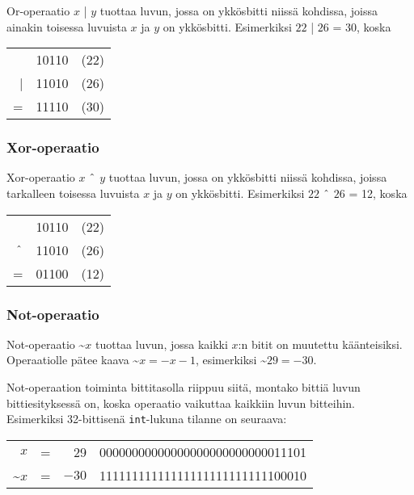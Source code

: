 
Or-operaatio $x$ | $y$ tuottaa luvun,
jossa on ykkösbitti niissä kohdissa,
joissa ainakin toisessa luvuista $x$ ja $y$ on ykkösbitti.
Esimerkiksi $22$ | $26$ = 30, koska

\begin{center}
\begin{tabular}{rrr}
& 10110 & (22)\\
| & 11010 & (26) \\
\hline
 = & 11110 & (30) \\
\end{tabular}
\end{center}

\subsubsection{Xor-operaatio}


Xor-operaatio $x$ $\XOR$ $y$ tuottaa luvun,
jossa on ykkösbitti niissä kohdissa,
joissa tarkalleen toisessa luvuista $x$ ja $y$ on ykkösbitti.
Esimerkiksi $22$ $\XOR$ $26$ = 12, koska

\begin{center}
\begin{tabular}{rrr}
& 10110 & (22)\\
$\XOR$ & 11010 & (26) \\
\hline
 = & 01100 & (12) \\
\end{tabular}
\end{center}

\subsubsection{Not-operaatio}


Not-operaatio \textasciitilde$x$ tuottaa luvun,
jossa kaikki $x$:n bitit on muutettu käänteisiksi.
Operaatiolle pätee kaava \textasciitilde$x = -x-1$,
esimerkiksi \textasciitilde$29 = -30$.

Not-operaation toiminta bittitasolla riippuu siitä,
montako bittiä luvun bittiesityksessä on,
koska operaatio vaikuttaa kaikkiin luvun bitteihin.
Esimerkiksi 32-bittisenä \texttt{int}-lukuna
tilanne on seuraava:

\begin{center}
\begin{tabular}{rrrr}
$x$ & = & 29 &   00000000000000000000000000011101 \\
\textasciitilde$x$ & = & $-30$ & 11111111111111111111111111100010 \\
\end{tabular}
\end{center}

